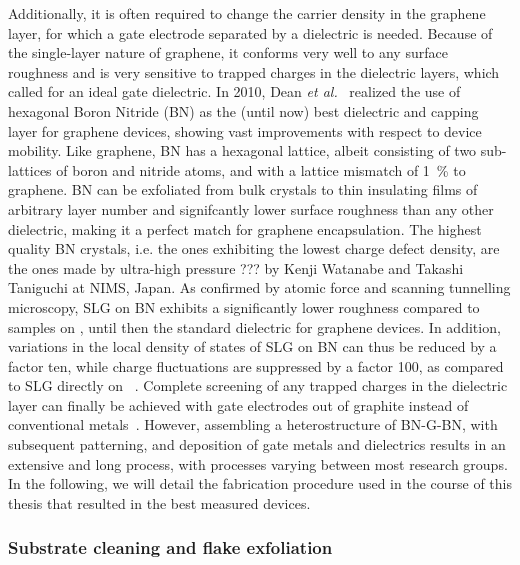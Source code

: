 Additionally, it is often required to change the carrier density in the graphene layer, for which a gate electrode separated by a dielectric is needed.
% 
Because of the single-layer nature of graphene, it conforms very well to any surface roughness and is very sensitive to trapped charges in the dielectric layers, which called for an ideal gate dielectric.
% 
In 2010, Dean \textit{et al.}~\cite{dean_boron_2010} realized the use of hexagonal Boron Nitride (BN) as the (until now) best dielectric and capping layer for graphene devices, showing vast improvements with respect to device mobility.
% 
Like graphene, BN has a hexagonal lattice, albeit consisting of two sub-lattices of boron and nitride atoms, and with a lattice mismatch of \SI{1}{\percent} to graphene.
% 
BN can be exfoliated from bulk crystals to thin insulating films of arbitrary layer number and signifcantly lower surface roughness than any other dielectric, making it a perfect match for graphene encapsulation.
% 
The highest quality BN crystals, i.e. the ones exhibiting the lowest charge defect density, are the ones made by ultra-high pressure ??? by Kenji Watanabe and Takashi Taniguchi at NIMS, Japan.
% 
As confirmed by atomic force and scanning tunnelling microscopy, SLG on BN exhibits a significantly lower roughness compared to samples on , until then the standard dielectric for graphene devices.
% 
In addition, variations in the local density of states of SLG on BN can thus be reduced by a factor ten, while charge fluctuations are suppressed by a factor 100, as compared to SLG directly on ~\cite{xueScanningTunnellingMicroscopy2011,deckerLocalElectronicProperties2011}.
% 
Complete screening of any trapped charges in the dielectric layer can finally be achieved with gate electrodes out of graphite instead of conventional metals~\cite{ponomarenkoTunableMetalInsulator2011,ametNovelPhenomenaDriven2014}.
% 
However, assembling a heterostructure of BN-G-BN, with subsequent patterning, and deposition of gate metals and dielectrics results in an extensive and long process, with processes varying between most research groups.
% 
In the following, we will detail the fabrication procedure used in the course of this thesis that resulted in the best measured devices.

\subsubsection{Substrate cleaning and flake exfoliation}

